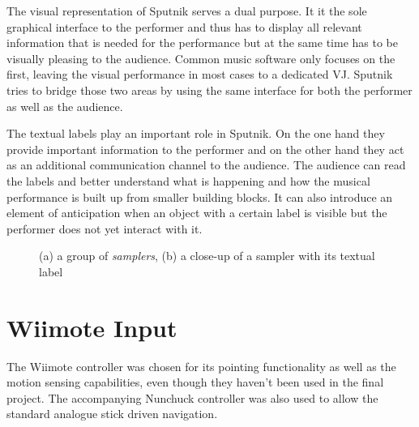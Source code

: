 \documentclass[10pt,a4paper]{scrartcl}
\begin{document}
The visual representation of Sputnik serves a dual purpose. It it the sole graphical interface to the performer and thus has to display all relevant information that is needed for the performance but at the same time has to be visually pleasing to the audience. Common music software only focuses on the first, leaving the visual performance in most cases to a dedicated VJ. Sputnik tries to bridge those two areas by using the same interface for both the performer as well as the audience.

The textual labels play an important role in Sputnik. On the one hand they provide important information to the performer and on the other hand they act as an additional communication channel to the audience. The audience can read the labels and better understand what is happening and how the musical performance is built up from smaller building blocks. It can also introduce an element of anticipation when an object with a certain label is visible but the performer does not yet interact with it.


\begin{figure}[hbtp]
\begin{center}
\caption{(a) a group of \emph{samplers}, (b) a close-up of a sampler with its textual label}
\end{center}
\end{figure}






\section{Wiimote Input}
The Wiimote controller was chosen for its pointing functionality as well as the motion sensing capabilities, even though they haven't been used in the final project. The accompanying Nunchuck controller was also used to allow the standard analogue stick driven navigation.
\end{document}
